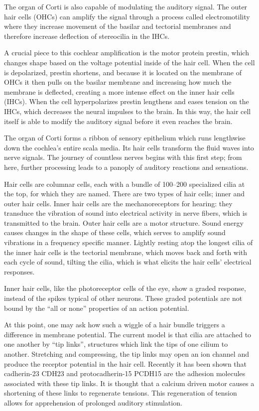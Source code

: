 \documentclass[]{book}
\begin{document}
The organ of Corti is also capable of modulating the auditory signal. The outer hair cells (OHCs) can amplify the signal through a process called electromotility where they increase movement of the basilar and tectorial membranes and therefore increase deflection of stereocilia in the IHCs.

A crucial piece to this cochlear amplification is the motor protein prestin, which changes shape based on the voltage potential inside of the hair cell. When the cell is depolarized, prestin shortens, and because it is located on the membrane of OHCs it then pulls on the basilar membrane and increasing how much the membrane is deflected, creating a more intense effect on the inner hair cells (IHCs). When the cell hyperpolarizes prestin lengthens and eases tension on the IHCs, which decreases the neural impulses to the brain. In this way, the hair cell itself is able to modify the auditory signal before it even reaches the brain.

The organ of Corti forms a ribbon of sensory epithelium which runs lengthwise down the cochlea's entire scala media. Its hair cells transform the fluid waves into nerve signals. The journey of countless nerves begins with this first step; from here, further processing leads to a panoply of auditory reactions and sensations.

Hair cells are columnar cells, each with a bundle of 100--200 specialized cilia at the top, for which they are named. There are two types of hair cells; inner and outer hair cells. Inner hair cells are the mechanoreceptors for hearing: they transduce the vibration of sound into electrical activity in nerve fibers, which is transmitted to the brain. Outer hair cells are a motor structure. Sound energy causes changes in the shape of these cells, which serves to amplify sound vibrations in a frequency specific manner. Lightly resting atop the longest cilia of the inner hair cells is the tectorial membrane, which moves back and forth with each cycle of sound, tilting the cilia, which is what elicits the hair cells' electrical responses.

Inner hair cells, like the photoreceptor cells of the eye, show a graded response, instead of the spikes typical of other neurons. These graded potentials are not bound by the ``all or none'' properties of an action potential.

At this point, one may ask how such a wiggle of a hair bundle triggers a difference in membrane potential. The current model is that cilia are attached to one another by ``tip links'', structures which link the tips of one cilium to another. Stretching and compressing, the tip links may open an ion channel and produce the receptor potential in the hair cell. Recently it has been shown that cadherin-23 CDH23 and protocadherin-15 PCDH15 are the adhesion molecules associated with these tip links. It is thought that a calcium driven motor causes a shortening of these links to regenerate tensions. This regeneration of tension allows for apprehension of prolonged auditory stimulation.
\end{document}
